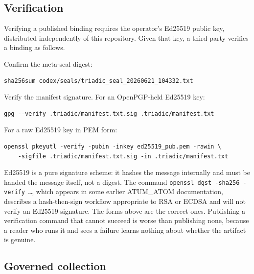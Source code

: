 \documentclass[11pt,a4paper]{article}
\begin{document}
\subsection{Verification}

Verifying a published binding requires the operator's Ed25519 public key,
distributed independently of this repository. Given that key, a third party
verifies a binding as follows.

\noindent Confirm the meta-seal digest:
\begin{lstlisting}
sha256sum codex/seals/triadic_seal_20260621_104332.txt
\end{lstlisting}

\noindent Verify the manifest signature. For an OpenPGP-held Ed25519 key:
\begin{lstlisting}
gpg --verify .triadic/manifest.txt.sig .triadic/manifest.txt
\end{lstlisting}

\noindent For a raw Ed25519 key in PEM form:
\begin{lstlisting}
openssl pkeyutl -verify -pubin -inkey ed25519_pub.pem -rawin \
    -sigfile .triadic/manifest.txt.sig -in .triadic/manifest.txt
\end{lstlisting}

\begin{remark}
Ed25519 is a pure signature scheme: it hashes the message internally and must
be handed the message itself, not a digest. The command
\texttt{openssl dgst -sha256 -verify \dots}, which appears in some earlier
ATUM\_ATOM documentation, describes a hash-then-sign workflow appropriate to
RSA or ECDSA and will not verify an Ed25519 signature. The forms above are
the correct ones. Publishing a verification command that cannot succeed is
worse than publishing none, because a reader who runs it and sees a failure
learns nothing about whether the artifact is genuine.
\end{remark}

\subsection{Governed collection}
\end{document}
